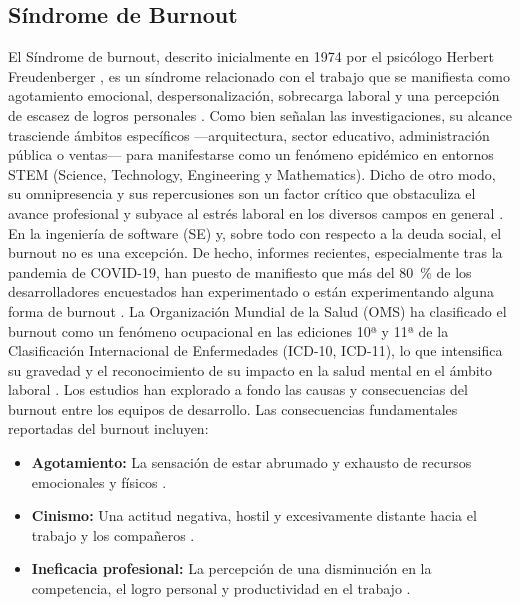 
\subsection{Síndrome de Burnout}

El Síndrome de \Gls{burnout}, descrito inicialmente en 1974 por el psicólogo Herbert Freudenberger \cite{tulili2022burnout}, es un síndrome relacionado con el trabajo que se manifiesta como agotamiento emocional, despersonalización, sobrecarga laboral y una percepción de escasez de logros personales \cite{tulili2022burnout}. Como bien señalan las investigaciones, su alcance trasciende ámbitos específicos —arquitectura, sector educativo, administración pública o ventas— \cite{tulili2022burnout} para manifestarse como un fenómeno epidémico en entornos STEM (Science, Technology, Engineering y Mathematics). Dicho de otro modo, su omnipresencia y sus repercusiones son un factor crítico que obstaculiza el avance profesional y subyace al estrés laboral en los diversos campos en general \cite{tulili2022burnout}.
En la ingeniería de software (SE) y, sobre todo con respecto a la deuda social, el burnout no es una excepción. De hecho, informes recientes, especialmente tras la pandemia de COVID-19, han puesto de manifiesto que más del 80~\% de los desarrolladores encuestados han experimentado o están experimentando alguna forma de burnout \cite{tulili2022burnout}. La Organización Mundial de la Salud (OMS) ha clasificado el burnout como un fenómeno ocupacional en las ediciones 10ª y 11ª de la Clasificación Internacional de Enfermedades (ICD-10, ICD-11), lo que intensifica su gravedad y el reconocimiento de su impacto en la salud mental en el ámbito laboral \cite{tulili2022burnout}.
Los estudios han explorado a fondo las causas y consecuencias del burnout entre los equipos de desarrollo. Las consecuencias fundamentales reportadas del burnout incluyen:
\begin{itemize}
    \item \textbf{Agotamiento:} La sensación de estar abrumado y exhausto de recursos emocionales y físicos \cite{tulili2022burnout}.
    \item \textbf{Cinismo:} Una actitud negativa, hostil y excesivamente distante hacia el trabajo y los compañeros \cite{tulili2022burnout}.
    \item \textbf{Ineficacia profesional:} La percepción de una disminución en la competencia, el logro personal y productividad en el trabajo \cite{tulili2022burnout}.
\end{itemize}
